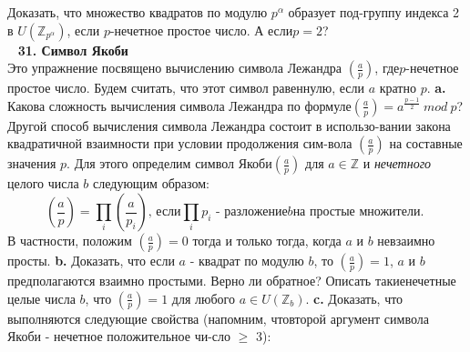 \documentclass{mai_book}
\begin{document}
    Доказать, что множество квадратов по модулю $p^\alpha$ образует под-\newline группу индекса 2 в $U(\mathbb{Z}_{p^\alpha})$, если $p$-нечетное простое число. А если\newline $p=2$?\\
    \ \newline
\noindent\textbf{31. Символ Якоби}\\

    Это упражнение посвящено вычислению символа Лежандра $(\frac{a}{p})$, где\newline $p$-нечетное простое число. Будем считать, что этот символ равен\newline нулю, если $a$ кратно $p$. \newline
\hspace*{15pt}\textbf{a.} Какова сложность вычисления символа Лежандра по формуле\newline $(\frac{a}{p})=a^{\frac{p-1}{2}}\ mod\ p$?\newline
\hspace*{15pt} Другой способ вычисления символа Лежандра состоит в использо-\newline вании закона квадратичной взаимности при условии продолжения сим-\newline вола $(\frac{a}{p})$ на составные значения $p$. Для этого определим символ Якоби\newline $(\frac{a}{p})$ для $a\in \mathbb{Z}$ и \textit{нечетного} целого числа $b$ следующим образом:\newline
        $$
        (\frac{a}{p}) = \prod\limits_{i} (\frac{a}{p_i})\text{, если} \prod_i p_i\text{ - разложение} b\text{на простые множители. }
        $$
\noindent В частности, положим $(\frac{a}{p}) = 0$ тогда и только тогда, когда $a$ и $b$ не\newline взаимно просты.\newline
\hspace*{15pt}\textbf{b.} Доказать, что если $a$ - квадрат по модулю $b$, то $(\frac{a}{p}) = 1$, $a$ и $b$\newline предполагаются взаимно простыми. Верно ли обратное? Описать такие\newline нечетные целые числа $b$, что $(\frac{a}{p}) = 1$ для любого $a\in U(\mathbb{Z}_b)$.\newline
\hspace*{15pt}\textbf{c.} Доказать, что выполняются следующие свойства (напомним, что\newline второй аргумент символа Якоби - нечетное положительное чи-\newline сло $\geqslant$ 3):
\end{document}
